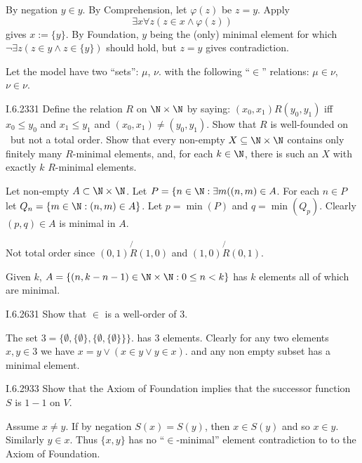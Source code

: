 By negation \(y\in y\).
By Comprehension, let \(\varphi(z)\) be \(z=y\). Apply
\begin{equation*}
  \exists x \forall z (z \in x \wedge \varphi(z))
\end{equation*}
gives \(x:=\{y\}\). By Foundation, $y$ being the (only) minimal
element for which
\mbox{\(\lnot\exists z(z\in y \wedge z \in \{y\})\)}
should hold, but \(z=y\) gives contradiction.

Let the model have two ``sets'': \(\mu\), \(\nu\).
with the following ``\(\in\)'' relations:
\(\mu\in\nu\), \(\nu\in\nu\).

\begin{lexcopy}{I.6.23}{31}
Define the relation $R$ on \(\N \times \N\) by saying: \((x_0,x_1)R(y_0,y_1)\)
iff \(x_0 \leq y_0\) and \(x_1 \leq y_1\)
and \((x_0,x_1)\neq (y_0,y_1)\).
Show that $R$ is well-founded
on \N\ but not a total order.
Show that every non-empty \(X \subseteq \N\times\N\) contains
only finitely many $R$-minimal elements, and, for each \(k \in\N\),
there is such an
$X$ with exactly $k$ $R$-minimal elements.
\end{lexcopy}

Let non-empty \(A \subset \N\times\N\).
Let \(P = \{n\in\N: \exists m((n,m)\in A\).
For each \(n\in P\) let \(Q_n = \{m\in\N: (n,m)\in A\}\).
Let \(p = \min(P)\) and \(q = \min(Q_p)\).
Clearly \((p,q)\in A\) is minimal in $A$.

Not total order since
\((0,1)\not{R}(1,0)\) and
\((1,0)\not{R}(0,1)\).

Given $k$, \(A=\{(n,k-n-1)\in\N\times\N: 0\leq n < k\}\)
has $k$ elements all of which are minimal.

\begin{lexcopy}{I.6.26}{31}
Show that \(\in\) is a well-order of $3$.
\end{lexcopy}

The set 
\(3 = \{\emptyset, \{\emptyset\}, \{\emptyset, \{\emptyset\}\}\}\).
has $3$ elements. Clearly for any two elements \(x,y\in 3\)
we have \(x=y \lor (x\in y \lor y \in x)\).
and any non empty subset has a minimal element.

\begin{lexcopy}{I.6.29}{33}
Show that the Axiom of Foundation implies that the successor
function $S$ is $1-1$ on $V$.
\end{lexcopy}
Assume \(x \neq y\). %
If by negation \(S(x) = S(y)\), then %
\(x \in S(y)\) and so \(x\in y\).
Similarly \(y \in x\). Thus \(\{x, y\}\) has no ``\(\in\)-minimal''
element contradiction to to the Axiom of Foundation.

